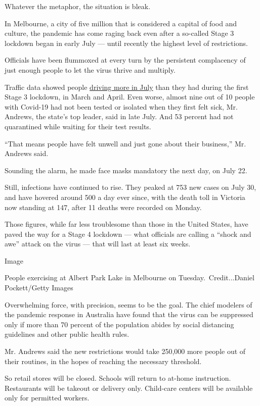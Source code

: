 Whatever the metaphor, the situation is bleak.

In Melbourne, a city of five million that is considered a capital of
food and culture, the pandemic has come raging back even after a
so-called Stage 3 lockdown began in early July --- until recently the
highest level of restrictions.

Officials have been flummoxed at every turn by the persistent
complacency of just enough people to let the virus thrive and multiply.

Traffic data showed people
\href{https://www.theage.com.au/national/victoria/lockdown-2-0-traffic-worse-compared-with-april-but-less-than-pre-covid-20200801-p55hlq.html}{driving
more in July} than they had during the first Stage 3 lockdown, in March
and April. Even worse, almost nine out of 10 people with Covid-19 had
not been tested or isolated when they first felt sick, Mr. Andrews, the
state's top leader, said in late July. And 53 percent had not
quarantined while waiting for their test results.

``That means people have felt unwell and just gone about their
business,'' Mr. Andrews said.

Sounding the alarm, he made face masks mandatory the next day, on July
22.

Still, infections have continued to rise. They peaked at 753 new cases
on July 30, and have hovered around 500 a day ever since, with the death
toll in Victoria now standing at 147, after 11 deaths were recorded on
Monday.

Those figures, while far less troublesome than those in the United
States, have paved the way for a Stage 4 lockdown --- what officials are
calling a ``shock and awe'' attack on the virus --- that will last at
least six weeks.

Image

People exercising at Albert Park Lake in Melbourne on
Tuesday.~Credit...Daniel Pockett/Getty Images

Overwhelming force, with precision, seems to be the goal. The chief
modelers of the pandemic response in Australia have found that the virus
can be suppressed only if more than 70 percent of the population abides
by social distancing guidelines and other public health rules.

Mr. Andrews said the new restrictions would take 250,000 more people out
of their routines, in the hopes of reaching the necessary threshold.

So retail stores will be closed. Schools will return to at-home
instruction. Restaurants will be takeout or delivery only. Child-care
centers will be available only for permitted workers.


